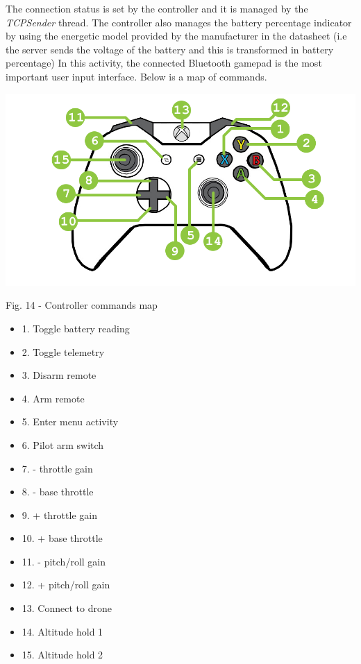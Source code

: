 \documentclass{IEEEtran}
\begin{document}
\noindent The connection status is set by the controller and it is managed by the \textit{TCPSender} thread. The controller also manages the battery percentage indicator by using the energetic model provided by the manufacturer in the datasheet (i.e the server sends the voltage of the battery and this is transformed in battery percentage)
\newline
In this activity, the connected Bluetooth gamepad is the most important user input interface. Below is a map of commands.
\begin{center}\includegraphics[scale=.3]{gamepad2.png}\end{center}
\begin{it}\begin{center}Fig. 14 - Controller commands map \end{center}\end{it}
\begin{multicols}{2}
\begin{itemize}
    \item[] 1. Toggle battery reading
    \item[] 2. Toggle telemetry
    \item[] 3. Disarm remote
    \item[] 4. Arm remote
    \item[] 5. Enter menu activity
    \item[] 6. Pilot arm switch
    \item[] 7. - throttle gain
    \item[] 8. - base throttle
    \item[] 9. + throttle gain
    \item[] 10. + base throttle
    \item[] 11. - pitch/roll gain
    \item[] 12. + pitch/roll gain
    \item[] 13. Connect to drone
    \item[] 14. Altitude hold 1
    \item[] 15. Altitude hold 2
\end{itemize}
\end{multicols}
\end{document}
